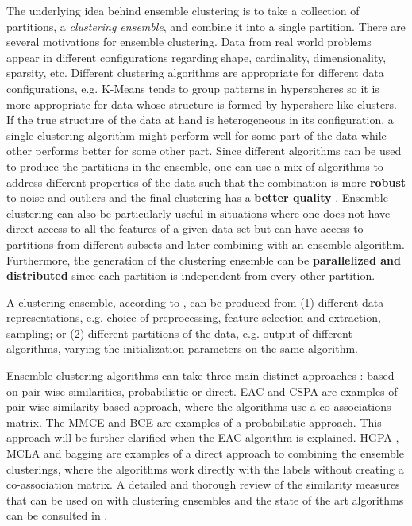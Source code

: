 The underlying idea behind ensemble clustering is to take a collection of partitions, a \emph{clustering ensemble}, and combine it into a single partition.
There are several motivations for ensemble clustering.
Data from real world problems appear in different configurations regarding shape, cardinality, dimensionality, sparsity, etc. 
Different clustering algorithms are appropriate for different data configurations, e.g. K-Means tends to group patterns in hyperspheres \cite{Jain1999} so it is more appropriate for data whose structure is formed by hypershere like clusters.
If the true structure of the data at hand is heterogeneous in its configuration, a single clustering algorithm might perform well for some part of the data while other performs better for some other part.
Since different algorithms can be used to produce the partitions in the ensemble, one can use a mix of algorithms to address different properties of the data such that the combination is more \textbf{robust} to noise and outliers \cite{topchy2004mixture} and the final clustering has a \textbf{better quality} \cite{Aggarwal2014}.
Ensemble clustering can also be particularly useful in situations where one does not have direct access to all the features of a given data set but can have access to partitions from different subsets and later combining with an ensemble algorithm.
Furthermore, the generation of the clustering ensemble can be \textbf{parallelized and distributed} since each partition is independent from every other partition.

A clustering ensemble, according to \cite{Fred2005}, can be produced from (1) different data representations, e.g. choice of preprocessing, feature selection and extraction, sampling; or (2) different partitions of the data, e.g. output of different algorithms, varying the initialization parameters on the same algorithm.

Ensemble clustering algorithms can take three main distinct approaches \cite{Aggarwal2014}: based on pair-wise similarities, probabilistic or direct.
EAC \cite{Fred2005} and CSPA \cite{Strehl2002} are examples of pair-wise similarity based approach, where the algorithms use a co-associations matrix.
The MMCE \cite{topchy2004mixture} and BCE \cite{wang2011bayesian} are examples of a probabilistic approach.
This approach will be further clarified when the EAC algorithm is explained.
HGPA \cite{Strehl2002}, MCLA \cite{Strehl2002} and bagging \cite{Dudoit2003} are examples of a direct approach to combining the ensemble clusterings, where the algorithms work directly with the labels without creating a co-association matrix.
A detailed and thorough review of the similarity measures that can be used on with clustering ensembles and the state of the art algorithms can be consulted in \cite{Aggarwal2014}.

